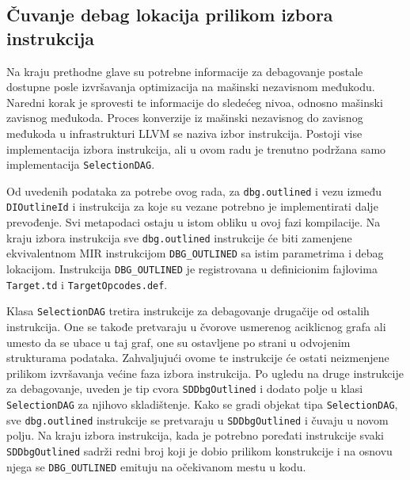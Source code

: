 \documentclass[12pt,oneside]{memoir}
\begin{document}
\subsection{Čuvanje debag lokacija prilikom izbora instrukcija}


Na kraju prethodne glave su potrebne informacije za debagovanje postale dostupne posle izvršavanja optimizacija na mašinski nezavisnom međukodu.
Naredni korak je sprovesti te informacije do sledećeg nivoa, odnosno mašinski zavisnog međukoda.
Proces konverzije iz mašinski nezavisnog do zavisnog međukoda u infrastrukturi LLVM se naziva izbor instrukcija.
Postoji vise implementacija izbora instrukcija, ali u ovom radu je trenutno podržana samo implementacija \verb|SelectionDAG|.

Od uvedenih podataka za potrebe ovog rada, za \verb|dbg.outlined| i vezu između \verb|DIOutlineId| i instrukcija za koje su vezane potrebno je implementirati dalje prevođenje.
Svi metapodaci ostaju u istom obliku u ovoj fazi kompilacije.
Na kraju izbora instrukcija sve \verb|dbg.outlined| instrukcije će biti zamenjene ekvivalentnom MIR instrukcijom \verb|DBG_OUTLINED| sa istim parametrima i debag lokacijom.
Instrukcija \verb|DBG_OUTLINED| je registrovana u definicionim fajlovima \verb|Target.td| i \verb|TargetOpcodes.def|.

Klasa \verb|SelectionDAG| tretira instrukcije za debagovanje drugačije od ostalih instrukcija. 
One se takođe pretvaraju u čvorove usmerenog aciklicnog grafa ali 
umesto da se ubace u taj graf, one su ostavljene po strani u odvojenim strukturama podataka. %
Zahvaljujući ovome te instrukcije će ostati neizmenjene prilikom izvršavanja većine faza izbora instrukcija.
Po ugledu na druge instrukcije za debagovanje, uveden je tip cvora \verb|SDDbgOutlined| i dodato polje u klasi \verb|SelectionDAG| za njihovo skladištenje.
Kako se gradi objekat tipa \verb|SelectionDAG|, sve \verb|dbg.outlined| instrukcije se pretvaraju u \verb|SDDbgOutlined| i čuvaju u novom polju.
Na kraju izbora instrukcija, kada je potrebno poređati instrukcije svaki \verb|SDDbgOutlined| sadrži redni broj koji je dobio prilikom konstrukcije i na osnovu njega se \verb|DBG_OUTLINED| emituju na očekivanom mestu u kodu.
\end{document}
